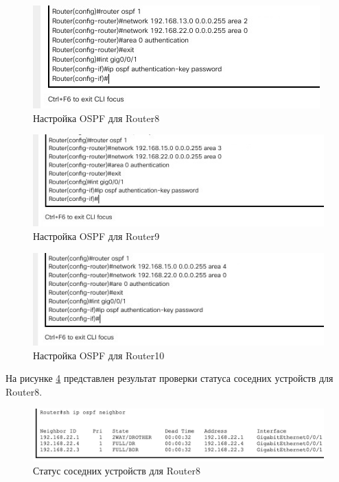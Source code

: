 \documentclass[12pt]{report}
\begin{document}
\begin{figure}[H]
	\begin{center}
		\includegraphics[scale=0.8]{img/6_1.jpg}
	\end{center}
	\caption{Настройка OSPF для Router8}
	\label{fig:6}
\end{figure}

\begin{figure}[H]
	\begin{center}
		\includegraphics[scale=0.8]{img/7_1.jpg}
	\end{center}
	\caption{Настройка OSPF для Router9}
	\label{fig:7}
\end{figure}

\begin{figure}[H]
	\begin{center}
		\includegraphics[scale=0.8]{img/8_1.jpg}
	\end{center}
	\caption{Настройка OSPF для Router10}
	\label{fig:8}
\end{figure}

На рисунке \ref{fig:9} представлен результат проверки статуса соседних устройств для Router8.

\begin{figure}[H]
	\begin{center}
		\includegraphics[scale=0.2]{img/9.jpg}
	\end{center}
	\caption{Статус соседних устройств для Router8}
	\label{fig:9}
\end{figure}
\end{document}
